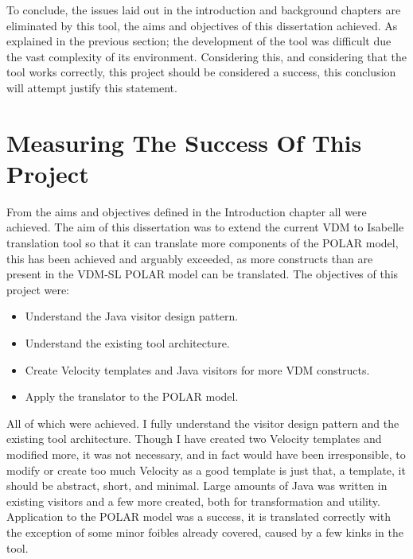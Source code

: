 To conclude, the issues laid out in the introduction and background chapters are eliminated by this tool, the aims and objectives of this dissertation achieved. As explained in the previous section; the development of the tool was difficult due the vast complexity of its environment. Considering this, and considering that the tool works correctly, this project should be considered a success, this conclusion will attempt justify this statement. 

\section{Measuring The Success Of This Project}
From the aims and objectives defined in the Introduction chapter all were achieved. The aim of this dissertation was to extend the current VDM to Isabelle translation tool so that it can translate more components of the POLAR model, this has been achieved and arguably exceeded, as more constructs than are present in the VDM-SL POLAR model can be translated. The objectives of this project were:
\begin{itemize}
	\item Understand the Java visitor design pattern.
	\item Understand the existing tool architecture.
	\item Create Velocity templates and Java visitors for more VDM constructs.
	\item Apply the translator to the POLAR model.
\end{itemize}

All of which were achieved. I fully understand the visitor design pattern and the existing tool architecture. Though I have created two Velocity templates and modified more, it was not necessary, and in fact would have been irresponsible, to modify or create too much Velocity as a good template is just that, a template, it should be abstract, short, and minimal. Large amounts of Java was written in existing visitors and a few more created, both for transformation and utility. Application to the POLAR model was a success, it is translated correctly with the exception of some minor foibles already covered, caused by a few kinks in the tool.

